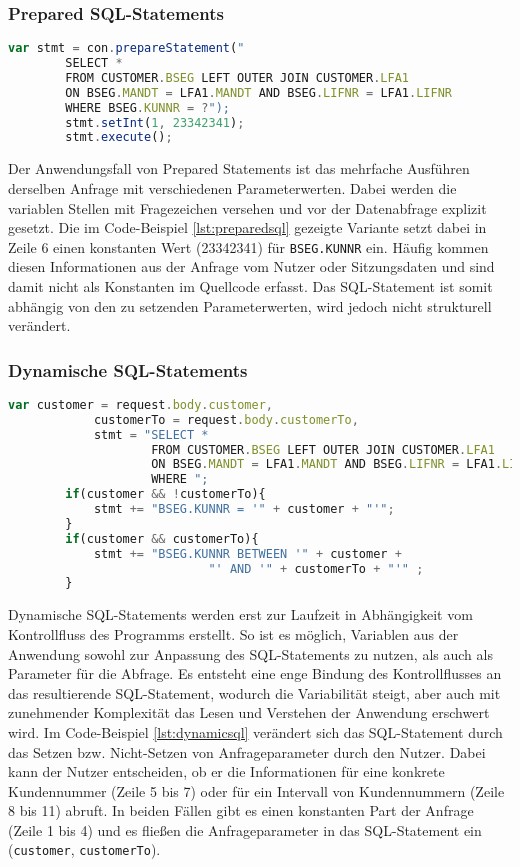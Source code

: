 \subsubsection{Prepared SQL-Statements}

	\begin{lstlisting}[caption={Prepared Statements eingebettet im Quellcode}, label={lst:preparedsql}, language=JavaScript]
		var stmt = con.prepareStatement("
		SELECT *
		FROM CUSTOMER.BSEG LEFT OUTER JOIN CUSTOMER.LFA1
		ON BSEG.MANDT = LFA1.MANDT AND BSEG.LIFNR = LFA1.LIFNR
		WHERE BSEG.KUNNR = ?");
		stmt.setInt(1, 23342341);
		stmt.execute();
	\end{lstlisting}

Der Anwendungsfall von Prepared Statements ist das mehrfache Ausführen derselben Anfrage mit verschiedenen Parameterwerten.
Dabei werden die variablen Stellen mit Fragezeichen versehen und vor der Datenabfrage explizit gesetzt.
Die im Code-Beispiel \ref{lst:preparedsql} gezeigte Variante setzt dabei in Zeile 6 einen konstanten Wert (23342341) für \texttt{BSEG.KUNNR} ein.
Häufig kommen diesen Informationen aus der Anfrage vom Nutzer oder Sitzungsdaten und sind damit nicht als Konstanten im Quellcode erfasst.
Das SQL-Statement ist somit abhängig von den zu setzenden Parameterwerten, wird jedoch nicht strukturell verändert.

\subsubsection{Dynamische SQL-Statements}

	\begin{lstlisting}[caption={Dynamische SQL-Statements können verschiedene Ausprägungen annehmen.}, label={lst:dynamicsql}, language=JavaScript]
		var customer = request.body.customer,
		    customerTo = request.body.customerTo,
		    stmt = "SELECT *
					FROM CUSTOMER.BSEG LEFT OUTER JOIN CUSTOMER.LFA1
					ON BSEG.MANDT = LFA1.MANDT AND BSEG.LIFNR = LFA1.LIFNR
					WHERE ";
		if(customer && !customerTo){
			stmt += "BSEG.KUNNR = '" + customer + "'";
		}
		if(customer && customerTo){
			stmt += "BSEG.KUNNR BETWEEN '" + customer +
							"' AND '" + customerTo + "'" ;
		}
	\end{lstlisting}

Dynamische SQL-Statements werden erst zur Laufzeit in Abhängigkeit vom Kontrollfluss des Programms erstellt.
So ist es möglich, Variablen aus der Anwendung sowohl zur Anpassung des SQL-Statements zu nutzen, als auch als Parameter für die Abfrage.
Es entsteht eine enge Bindung des Kontrollflusses an das resultierende SQL-Statement, wodurch die Variabilität steigt, aber auch mit zunehmender Komplexität das Lesen und Verstehen der Anwendung erschwert wird.
Im Code-Beispiel \ref{lst:dynamicsql} verändert sich das SQL-Statement durch das Setzen bzw. Nicht-Setzen von Anfrageparameter durch den Nutzer.
Dabei kann der Nutzer entscheiden, ob er die Informationen für eine konkrete Kundennummer (Zeile 5 bis 7) oder für ein Intervall von Kundennummern (Zeile 8 bis 11) abruft.
In beiden Fällen gibt es einen konstanten Part der Anfrage (Zeile 1 bis 4) und es fließen die Anfrageparameter in das SQL-Statement ein (\texttt{customer}, \texttt{customerTo}).


